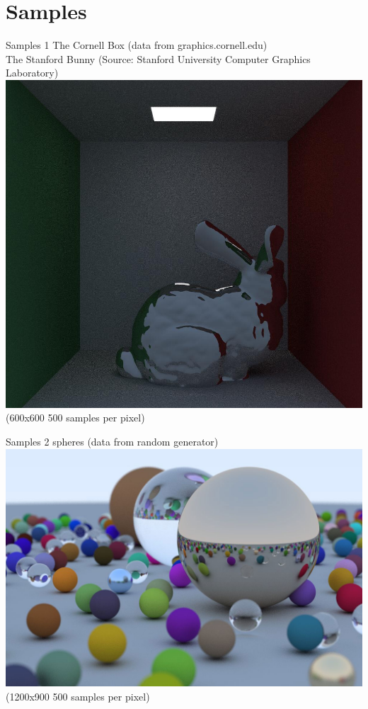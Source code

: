 \documentclass{beamer}
\begin{document}
\section{Samples}
\begin{frame} {Samples 1}
\normalsize The Cornell Box \tiny (data from graphics.cornell.edu) \\
\normalsize The Stanford Bunny \tiny (Source: Stanford University Computer Graphics Laboratory) \\
\includegraphics[scale=0.25]{bunny.jpg}
\tiny (600x600 500 samples per pixel) \\
\end{frame}

\begin{frame} {Samples 2}
\normalsize spheres \tiny (data from random generator) \\
\includegraphics[scale=0.2]{balls.jpg} \\
\tiny (1200x900 500 samples per pixel) \\
\end{frame}
\end{document}
